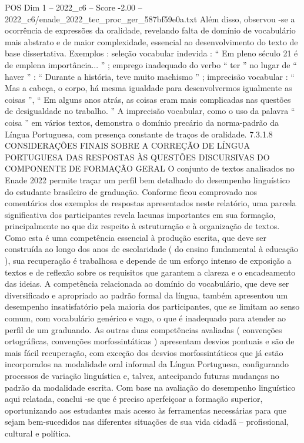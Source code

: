 \begin{textsample}{POS Dim 1 – 2022\_c6 – Score -2.00 – 2022\_c6/enade\_2022\_tec\_proc\_ger\_587bf59e0a.txt}
Além disso, observou -se a ocorrência de expressões da oralidade, revelando falta de domínio de vocabulário mais abstrato e de maior complexidade, essencial ao desenvolvimento do texto de base dissertativa.
Exemplos : seleção vocabular indevida : “ Em pleno século 21 é de emplena importância... ” ; emprego inadequado do verbo “ ter ” no lugar de “ haver ” : “ Durante a história, teve muito machismo ” ; imprecisão vocabular : “ Mas a cabeça, o corpo, há mesma igualdade para desenvolvermos igualmente as coisas ”, “ Em alguns anos atrás, as coisas eram mais complicadas nas questões de desigualdade no trabalho. ” A imprecisão vocabular, como o uso da palavra “ coisa ” em vários textos, demonstra o domínio precário da norma-padrão da Língua Portuguesa, com presença constante de traços de oralidade. 7.3.1.8 CONSIDERAÇÕES FINAIS SOBRE A CORREÇÃO DE LÍNGUA PORTUGUESA DAS RESPOSTAS ÀS QUESTÕES DISCURSIVAS DO COMPONENTE DE FORMAÇÃO GERAL O conjunto de textos analisados no Enade 2022 permite traçar um perfil bem detalhado do desempenho linguístico do estudante brasileiro de graduação.
Conforme ficou comprovado nos comentários dos exemplos de respostas apresentados neste relatório, uma parcela significativa dos participantes revela lacunas importantes em sua formação, principalmente no que diz respeito à estruturação e à organização de textos.
Como esta é uma competência essencial à produção escrita, que deve ser construída ao longo dos anos de escolaridade ( do ensino fundamental à educação ), sua recuperação é trabalhosa e depende de um esforço intenso de exposição a textos e de reflexão sobre os requisitos que garantem a clareza e o encadeamento das ideias.
A competência relacionada ao domínio do vocabulário, que deve ser diversificado e apropriado ao padrão formal da língua, também apresentou um desempenho insatisfatório pela maioria dos participantes, que se limitam ao senso comum, com vocabulário genérico e vago, o que é inadequado para atender ao perfil de um graduando.
As outras duas competências avaliadas ( convenções ortográficas, convenções morfossintáticas ) apresentam desvios pontuais e são de mais fácil recuperação, com exceção dos desvios morfossintáticos que já estão incorporados na modalidade oral informal da Língua Portuguesa, configurando processos de variação linguística e, talvez, antecipando futuras mudanças no padrão da modalidade escrita.
Com base na avaliação do desempenho linguístico aqui relatada, conclui -se que é preciso aperfeiçoar a formação superior, oportunizando aos estudantes mais acesso às ferramentas necessárias para que sejam bem-sucedidos nas diferentes situações de sua vida cidadã – profissional, cultural e política.

\end{textsample}
